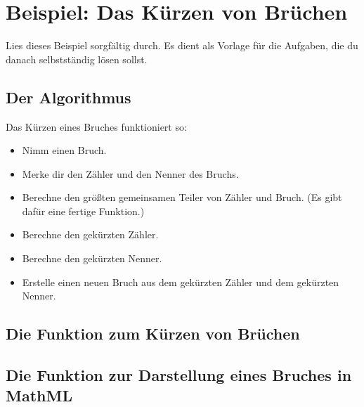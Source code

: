 \section{Beispiel: Das Kürzen von Brüchen}

Lies dieses Beispiel sorgfältig durch. Es dient als Vorlage für die Aufgaben, die du danach selbstständig lösen sollst.

\subsection{Der Algorithmus}

Das Kürzen eines Bruches funktioniert so:
\begin{itemize}
	\item Nimm einen Bruch.
	\item Merke dir den Zähler und den Nenner des Bruchs.
	\item Berechne den größten gemeinsamen Teiler von Zähler und Bruch. (Es gibt dafür eine fertige Funktion.)
	\item Berechne den gekürzten Zähler.
	\item Berechne den gekürzten Nenner.
	\item Erstelle einen neuen Bruch aus dem gekürzten Zähler und dem gekürzten Nenner.
\end{itemize}

\subsection{Die Funktion zum Kürzen von Brüchen}

\subsection{Die Funktion zur Darstellung eines Bruches in MathML}